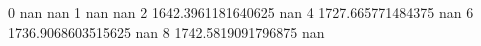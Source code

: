 0 nan nan
1 nan nan
2 1642.3961181640625 nan
4 1727.665771484375 nan
6 1736.9068603515625 nan
8 1742.5819091796875 nan
